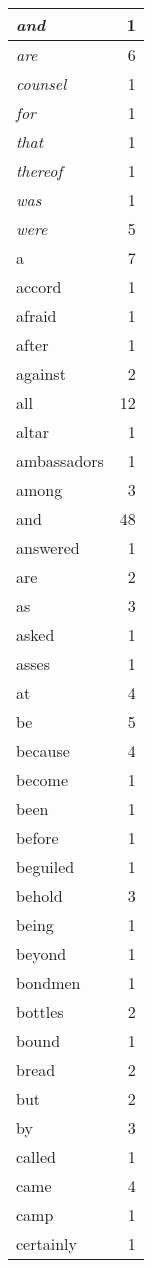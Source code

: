 \begin{center}
\begin{longtable}{l|r}
\emph{and} & 1\\ \hline 
\emph{are} & 6\\ \hline 
\emph{counsel} & 1\\ \hline 
\emph{for} & 1\\ \hline 
\emph{that} & 1\\ \hline 
\emph{thereof} & 1\\ \hline 
\emph{was} & 1\\ \hline 
\emph{were} & 5\\ \hline 
a & 7\\ \hline 
accord & 1\\ \hline 
afraid & 1\\ \hline 
after & 1\\ \hline 
against & 2\\ \hline 
all & 12\\ \hline 
altar & 1\\ \hline 
ambassadors & 1\\ \hline 
among & 3\\ \hline 
and & 48\\ \hline 
answered & 1\\ \hline 
are & 2\\ \hline 
as & 3\\ \hline 
asked & 1\\ \hline 
asses & 1\\ \hline 
at & 4\\ \hline 
be & 5\\ \hline 
because & 4\\ \hline 
become & 1\\ \hline 
been & 1\\ \hline 
before & 1\\ \hline 
beguiled & 1\\ \hline 
behold & 3\\ \hline 
being & 1\\ \hline 
beyond & 1\\ \hline 
bondmen & 1\\ \hline 
bottles & 2\\ \hline 
bound & 1\\ \hline 
bread & 2\\ \hline 
but & 2\\ \hline 
by & 3\\ \hline 
called & 1\\ \hline 
came & 4\\ \hline 
camp & 1\\ \hline 
certainly & 1\\ \hline 

\end{longtable}
\end{center}
